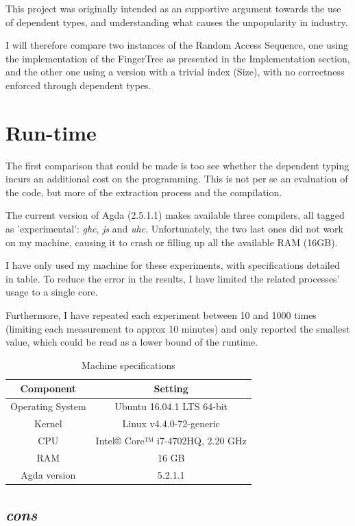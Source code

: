 \documentclass[12pt,twoside,notitlepage]{report}
\begin{document}
This project was originally intended as an supportive argument towards the use of dependent types, and understanding what causes the unpopularity in industry.

I will therefore compare two instances of the Random Access Sequence, one using the implementation of the FingerTree as presented in the Implementation section, and the other one using a version with a trivial index (Size), with no correctness enforced through dependent types.

\section{Run-time}

The first comparison that could be made is too see whether the dependent typing incurs an additional cost on the programming. This is not per se an evaluation of the code, but more of the extraction process and the compilation. 

The current version of Agda (2.5.1.1) makes available three compilers, all tagged as 'experimental': \textit{ghc}, \textit{js} and \textit{uhc}. Unfortunately, the two last ones did not work on my machine, causing it to crash or filling up all the available RAM (16GB).

I have only used my machine for these experiments, with specifications detailed in table. To reduce the error in the results, I have limited the related processes' usage to a single core.

Furthermore, I have repeated each experiment between 10 and 1000 times (limiting each measurement to approx 10 minutes) and only reported the smallest value, which could be read as a lower bound of the runtime.

\begin{table}[h!]
\centering
	\begin{tabular}{c c} 
	\hline 
	Component & Setting \\
	\hline
 	Operating System & Ubuntu 16.04.1 LTS 64-bit \\
 	Kernel & Linux v4.4.0-72-generic \\ 
 	CPU & Intel® Core™ i7-4702HQ, 2.20 GHz \\
 	RAM & 16 GB \\
 	Agda version & 5.2.1.1 \\
	\hline
	\end{tabular}
\caption{Machine specifications}
\end{table} 

\subsection{\textit{cons}}
\end{document}
